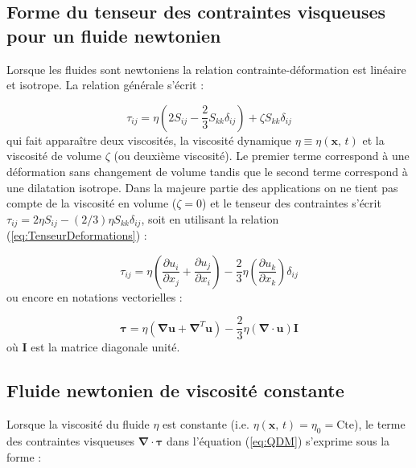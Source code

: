 \subsection*{Forme du tenseur des contraintes visqueuses pour un fluide newtonien}

Lorsque les fluides sont newtoniens la relation contrainte-d\'eformation
est lin\'eaire et isotrope. La relation g\'en\'erale s'\'ecrit :

\begin{equation}
\tau_{ij}=\eta\left(2S_{ij}-\frac{2}{3}S_{kk}\delta_{ij}\right)+\zeta S_{kk}\delta_{ij}\label{eq:Contraintes-Newtonien}
\end{equation}
qui fait appara\^itre deux viscosit\'es, la viscosit\'e dynamique $\eta\equiv\eta(\mathbf{x},\,t)$
et la viscosit\'e de volume $\zeta$ (ou deuxi\`eme viscosit\'e). Le premier
terme correspond \`a une d\'eformation sans changement de volume tandis
que le second terme correspond \`a une dilatation isotrope. Dans la
majeure partie des applications on ne tient pas compte de la viscosit\'e
en volume ($\zeta=0$) et le tenseur des contraintes s'\'ecrit $\tau_{ij}=2\eta S_{ij}-(2/3)\eta S_{kk}\delta_{ij}$,
soit en utilisant la relation (\ref{eq:TenseurDeformations}) :

\begin{equation}
\tau_{ij}=\eta\left(\frac{\partial u_{i}}{\partial x_{j}}+\frac{\partial u_{j}}{\partial x_{i}}\right)-\frac{2}{3}\eta\left(\frac{\partial u_{k}}{\partial x_{k}}\right)\delta_{ij}\label{eq:Contraintes}
\end{equation}
ou encore en notations vectorielles :

\begin{equation}
\boldsymbol{\tau}=\eta(\boldsymbol{\nabla}\mathbf{u}+\boldsymbol{\nabla}^{T}\mathbf{u})-\frac{2}{3}\eta(\boldsymbol{\nabla}\cdot\mathbf{u})\mathbf{I}\label{eq:Contraintes-Deformations_Newtonien}
\end{equation}
o\`u $\mathbf{I}$ est la matrice diagonale unit\'e.


\subsection*{Fluide newtonien de viscosit\'e constante}

Lorsque la viscosit\'e du fluide $\eta$ est constante (i.e. $\eta(\mathbf{x},\,t)=\eta_{0}=\mbox{Cte}$),
le terme des contraintes visqueuses $\boldsymbol{\nabla}\cdot\boldsymbol{\tau}$
dans l'\'equation (\ref{eq:QDM}) s'exprime sous la forme :

